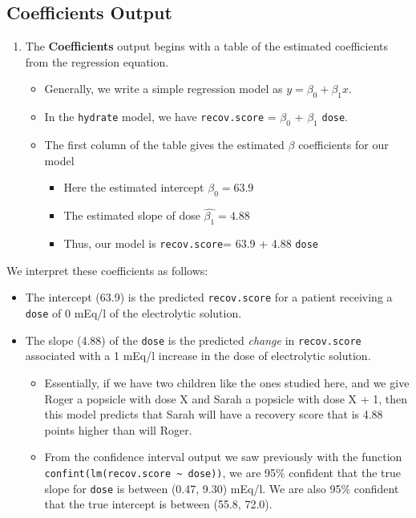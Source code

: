 \documentclass[
]{book}
\providecommand{\tightlist}{%
  \setlength{\itemsep}{0pt}\setlength{\parskip}{0pt}}
\begin{document}
\hypertarget{coefficients-output}{%
\subsection{Coefficients Output}\label{coefficients-output}}

\begin{enumerate}
\def\labelenumi{\arabic{enumi}.}
\setcounter{enumi}{2}
\tightlist
\item
  The \textbf{Coefficients} output begins with a table of the estimated coefficients from the regression equation.

  \begin{itemize}
  \tightlist
  \item
    Generally, we write a simple regression model as \(y = \beta_0 + \beta_1 x\).
  \item
    In the \texttt{hydrate} model, we have \texttt{recov.score} = \(\beta_0\) + \(\beta_1\) \texttt{dose}.
  \item
    The first column of the table gives the estimated \(\beta\) coefficients for our model

    \begin{itemize}
    \tightlist
    \item
      Here the estimated intercept \(\hat{\beta_0} = 63.9\)
    \item
      The estimated slope of dose \(\hat{\beta_1} = 4.88\)
    \item
      Thus, our model is \texttt{recov.score}= 63.9 + 4.88 \texttt{dose}
    \end{itemize}
  \end{itemize}
\end{enumerate}

We interpret these coefficients as follows:

\begin{itemize}
\tightlist
\item
  The intercept (63.9) is the predicted \texttt{recov.score} for a patient receiving a \texttt{dose} of 0 mEq/l of the electrolytic solution.
\item
  The slope (4.88) of the \texttt{dose} is the predicted \emph{change} in \texttt{recov.score} associated with a 1 mEq/l increase in the dose of electrolytic solution.

  \begin{itemize}
  \tightlist
  \item
    Essentially, if we have two children like the ones studied here, and we give Roger a popsicle with dose X and Sarah a popsicle with dose X + 1, then this model predicts that Sarah will have a recovery score that is 4.88 points higher than will Roger.
  \item
    From the confidence interval output we saw previously with the function \texttt{confint(lm(recov.score\ \textasciitilde{}\ dose))}, we are 95\% confident that the true slope for \texttt{dose} is between (0.47, 9.30) mEq/l. We are also 95\% confident that the true intercept is between (55.8, 72.0).
  \end{itemize}
\end{itemize}
\end{document}
